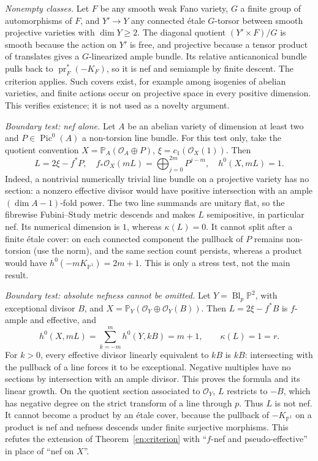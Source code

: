 \documentclass[12pt]{amsart}
\theoremstyle{definition}
\theoremstyle{remark}
\numberwithin{equation}{section}
\newcommand{\cO}{\mathcal{O}}
\DeclareMathOperator{\pr}{pr}
\newcommand{\mP}{\mathbb{P}}
\newcommand{\Pic}{\operatorname{Pic}}
\begin{document}
\textit{Nonempty classes.} Let $F$ be any smooth weak Fano variety, $G$ a finite group of automorphisms of $F$, and $Y'\to Y$ any connected \'etale $G$-torsor between smooth projective varieties with $\dim Y\geq2$. The diagonal quotient $(Y'\times F)/G$ is smooth because the action on $Y'$ is free, and projective because a tensor product of translates gives a $G$-linearized ample bundle. Its relative anticanonical bundle pulls back to $\pr_F^*(-K_F)$, so it is nef and semiample by finite descent. The criterion applies. Such covers exist, for example among isogenies of abelian varieties, and finite actions occur on projective space in every positive dimension. This verifies existence; it is not used as a novelty argument.

\textit{Boundary test: nef alone.} Let $A$ be an abelian variety of dimension at least two and $P\in\Pic^0(A)$ a non-torsion line bundle. For this test only, take the quotient convention $X=\mP_A(\cO_A\oplus P)$, $\xi=c_1(\cO_X(1))$. Then
\[
 L=2\xi-f^*P,\quad
 f_*\cO_X(mL)=\bigoplus_{j=0}^{2m}P^{j-m},\quad h^0(X,mL)=1.
\]
Indeed, a nontrivial numerically trivial line bundle on a projective variety has no section: a nonzero effective divisor would have positive intersection with an ample $(\dim A-1)$-fold power. The two line summands are unitary flat, so the fibrewise Fubini--Study metric descends and makes $L$ semipositive, in particular nef. Its numerical dimension is $1$, whereas $\kappa(L)=0$. It cannot split after a finite \'etale cover: on each connected component the pullback of $P$ remains non-torsion (use the norm), and the same section count persists, whereas a product would have $h^0(-mK_{\mP^1})=2m+1$. This is only a stress test, not the main result.

\textit{Boundary test: absolute nefness cannot be omitted.} Let $Y=\operatorname{Bl}_p\mP^2$, with exceptional divisor $B$, and $X=\mP_Y(\cO_Y\oplus\cO_Y(B))$. Then $L=2\xi-f^*B$ is $f$-ample and effective, and
\[
 h^0(X,mL)=\sum_{k=-m}^{m}h^0(Y,kB)=m+1,
 \qquad \kappa(L)=1=r.
\]
For $k>0$, every effective divisor linearly equivalent to $kB$ is $kB$: intersecting with the pullback of a line forces it to be exceptional. Negative multiples have no sections by intersection with an ample divisor. This proves the formula and its linear growth. On the quotient section associated to $\cO_Y$, $L$ restricts to $-B$, which has negative degree on the strict transform of a line through $p$. Thus $L$ is not nef. It cannot become a product by an \'etale cover, because the pullback of $-K_{\mP^1}$ on a product is nef and nefness descends under finite surjective morphisms. This refutes the extension of Theorem~\ref{en:criterion} with ``$f$-nef and pseudo-effective'' in place of ``nef on $X$''.
\end{document}
